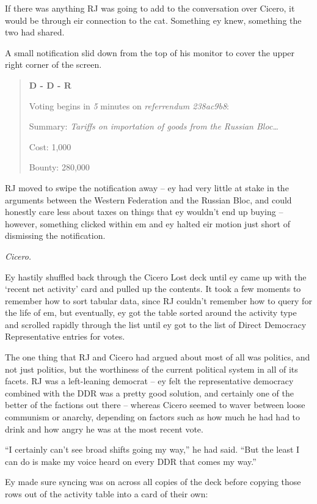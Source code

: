 If there was anything RJ was going to add to the conversation over Cicero, it would be through eir connection to the cat.  Something ey knew, something the two had shared.

A small notification slid down from the top of his monitor to cover the upper right corner of the screen.

\begin{quotation}
  \textbf{D - D - R}

  Voting begins in \textit{5} minutes on \textit{referrendum 238ac9b8}:

  Summary: \textit{Tariffs on importation of goods from the Russian Bloc\ldots}

  Cost: 1,000

  Bounty: 280,000
\end{quotation}

RJ moved to swipe the notification away -- ey had very little at stake in the arguments between the Western Federation and the Russian Bloc, and could honestly care less about taxes on things that ey wouldn't end up buying -- however, something clicked within em and ey halted eir motion just short of dismissing the notification.

\textit{Cicero.}

Ey hastily shuffled back through the Cicero Lost deck until ey came up with the `recent net activity' card and pulled up the contents.  It took a few moments to remember how to sort tabular data, since RJ couldn't remember how to query for the life of em, but eventually, ey got the table sorted around the activity type and scrolled rapidly through the list until ey got to the list of Direct Democracy Representative entries for votes.

The one thing that RJ and Cicero had argued about most of all was politics, and not just politics, but the worthiness of the current political system in all of its facets.  RJ was a left-leaning democrat -- ey felt the representative democracy combined with the DDR was a pretty good solution, and certainly one of the better of the factions out there -- whereas Cicero seemed to waver between loose communism or anarchy, depending on factors such as how much he had had to drink and how angry he was at the most recent vote.

``I certainly can't see broad shifts going my way,'' he had said.  ``But the least I can do is make my voice heard on every DDR that comes my way.''

Ey made sure syncing was on across all copies of the deck before copying those rows out of the activity table into a card of their own:

